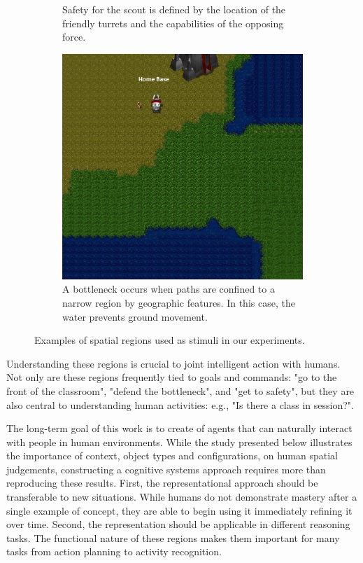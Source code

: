 \documentclass[11pt,letterpaper]{article}
\begin{document}
\begin{figure}
\begin{subfigure}[b]{0.3\textwidth}
  \caption{Safety for the scout is defined by the location of the friendly turrets and the capabilities of the opposing force.}
\end{subfigure}
\begin{subfigure}[b]{0.3\textwidth}
  \includegraphics[width=\textwidth]{figures/bottleneck.JPG}
  \caption{A bottleneck occurs when paths are confined to a narrow region by geographic features.  In this case, the water prevents ground movement.}
  \label{fig:safety}
  \end{subfigure}
  
  \caption{Examples of spatial regions used as stimuli in our experiments.}
  \label{fig:examples}
\end{figure}

Understanding these regions is crucial to joint intelligent action with humans.  Not only are these regions frequently tied to goals and commands: "go to the front of the classroom", "defend the bottleneck", and "get to safety", but they are also central to understanding human activities: e.g., "Is there a class in session?".

The long-term goal of this work is to create of agents that can naturally interact with people in human environments.  While the study presented below illustrates the importance of context, object types and configurations, on human spatial judgements, constructing a cognitive systems approach requires more than reproducing these results.  First, the representational approach should be transferable to new situations.  While humans do not demonstrate mastery after a single example of concept, they are able to begin using it immediately refining it over time.  Second, the representation should be applicable in different reasoning tasks.  The functional nature of these regions makes them important for many tasks from action planning to activity recognition.
\end{document}
